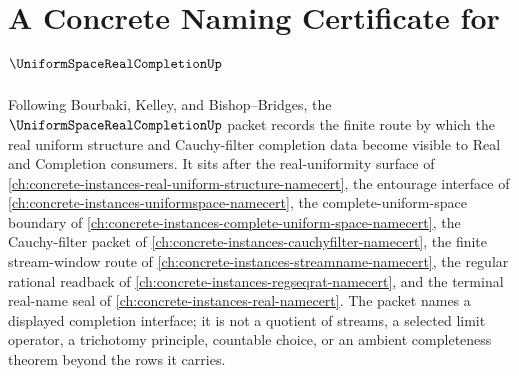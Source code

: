 \chapter{A Concrete Naming Certificate for $\UniformSpaceRealCompletionUp$}
\label{ch:concrete-instances-uniform-space-real-completion-namecert}

Following Bourbaki, Kelley, and Bishop--Bridges, the $\UniformSpaceRealCompletionUp$ packet records the finite route by which the real uniform structure and Cauchy-filter completion data become visible to Real and Completion consumers. It sits after the real-uniformity surface of \autoref{ch:concrete-instances-real-uniform-structure-namecert}, the entourage interface of \autoref{ch:concrete-instances-uniformspace-namecert}, the complete-uniform-space boundary of \autoref{ch:concrete-instances-complete-uniform-space-namecert}, the Cauchy-filter packet of \autoref{ch:concrete-instances-cauchyfilter-namecert}, the finite stream-window route of \autoref{ch:concrete-instances-streamname-namecert}, the regular rational readback of \autoref{ch:concrete-instances-regseqrat-namecert}, and the terminal real-name seal of \autoref{ch:concrete-instances-real-namecert}. The packet names a displayed completion interface; it is not a quotient of streams, a selected limit operator, a trichotomy principle, countable choice, or an ambient completeness theorem beyond the rows it carries.

